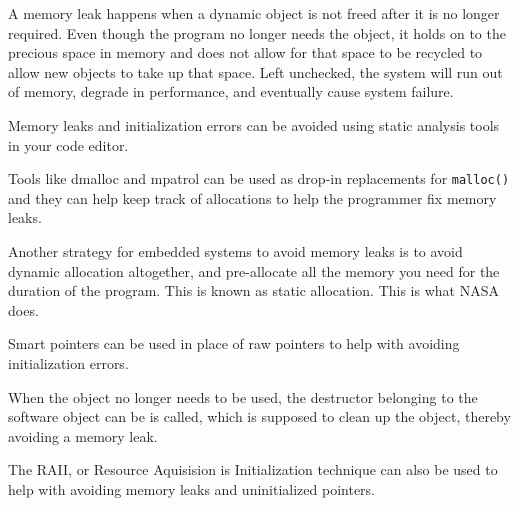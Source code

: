 A memory leak happens when a dynamic object is not freed after it is no longer
required. Even though the program no longer needs the object, it holds on to the
precious space in memory and does not allow for that space to be recycled to
allow new objects to take up that space. Left unchecked, the system will run out
of memory, degrade in performance, and eventually cause system failure.

Memory leaks and initialization errors can be avoided using static analysis
tools in your code editor. 

Tools like dmalloc and mpatrol can be used as drop-in
replacements for \texttt{malloc()} and they can help keep track of allocations
to help the programmer fix memory leaks. 

Another strategy for embedded systems to avoid memory leaks is to avoid dynamic
allocation altogether, and pre-allocate all the memory you need for the duration
of the program. This is known as static allocation. This is what NASA does.

Smart pointers can be used in place of raw pointers to help with avoiding
initialization errors.

When the object no longer needs to be used, the destructor belonging to the
software object can be is called, which is supposed to clean up the object,
thereby avoiding a memory leak. 

The RAII, or Resource Aquisision is Initialization technique can also be used to
help with avoiding memory leaks and uninitialized pointers.
